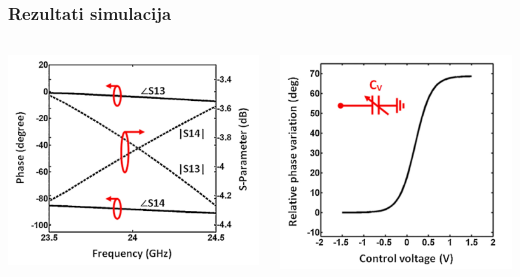 \documentclass{beamer}
\begin{document}
\begin{frame}
\frametitle{Rezultati simulacija}
\begin{columns}
  \begin{column}{0.5\textwidth}
    \includegraphics[width=\textwidth]{sparam_hybrid_coupler.png}
  \end{column}
  \begin{column}{0.5\textwidth}
    \includegraphics[width=\textwidth]{phase_variation_across_control_voltage.png}
  \end{column}
\end{columns}
\end{frame}
\end{document}

